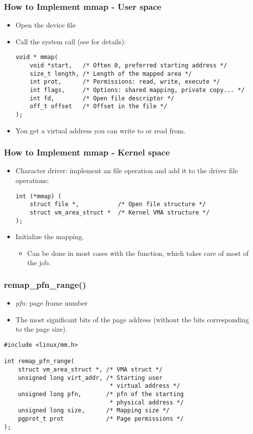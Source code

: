 \begin{frame}[fragile]
  \frametitle{How to Implement mmap - User space}
  \begin{itemize}
  \item Open the device file
  \item Call the  system call (see  for
    details):
    \begin{verbatim}
void * mmap(
    void *start,   /* Often 0, preferred starting address */
    size_t length, /* Length of the mapped area */
    int prot,      /* Permissions: read, write, execute */
    int flags,     /* Options: shared mapping, private copy... */
    int fd,        /* Open file descriptor */
    off_t offset   /* Offset in the file */
);
    \end{verbatim}
  \item You get a virtual address you can write to or read from.
  \end{itemize}
\end{frame}

\begin{frame}[fragile]
  \frametitle{How to Implement mmap - Kernel space}
  \begin{itemize}
  \item Character driver: implement an  file operation and add it
    to the driver file operations:
    \begin{verbatim}
int (*mmap) (
    struct file *,           /* Open file structure */
    struct vm_area_struct *  /* Kernel VMA structure */
);
    \end{verbatim}
  \item Initialize the mapping.
    \begin{itemize}
    \item Can be done in most cases with the 
      function, which takes care of most of the job.
    \end{itemize}
  \end{itemize}
\end{frame}

\begin{frame}[fragile]
  \frametitle{remap\_pfn\_range()}
  \begin{itemize}
  \item \emph{pfn}: page frame number
  \item The most significant bits of the page address (without the
    bits corresponding to the page size).
  \end{itemize}
  \begin{verbatim}
#include <linux/mm.h>

int remap_pfn_range(
    struct vm_area_struct *, /* VMA struct */
    unsigned long virt_addr, /* Starting user
                              * virtual address */
    unsigned long pfn,       /* pfn of the starting
                              * physical address */
    unsigned long size,      /* Mapping size */
    pgprot_t prot            /* Page permissions */
);
  \end{verbatim}
\end{frame}

